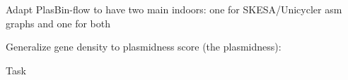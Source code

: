 \begin{todobox}
  Adapt PlasBin-flow to have two main indoors: one for SKESA/Unicycler asm graphs and one for both
\end{todobox}

\begin{todobox}
  Generalize gene density to plasmidness score (the plasmidness):

  \begin{CheckList}{Task}
  \end{CheckList}
\end{todobox}